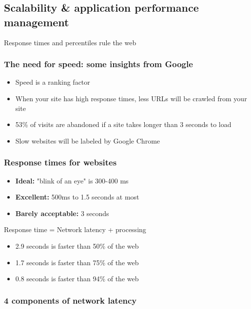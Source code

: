 \documentclass{article}
\begin{document}
\subsection{Scalability \& application performance management}

Response times and percentiles rule the web

\subsubsection{The need for speed: some insights from Google}

\begin{itemize}
    \item Speed is a ranking factor
    \item When your site has high response times, less URLs will be crawled from your site
    \item 53\% of visits are abandoned if a site takes longer than 3 seconds to load
    \item Slow websites will be labeled by Google Chrome
\end{itemize}

\subsubsection{Response times for websites}

\begin{itemize}
    \item \textbf{Ideal:} "blink of an eye" is 300-400 ms
    \item \textbf{Excellent:} 500ms to 1.5 seconds at most
    \item \textbf{Barely acceptable:} 3 seconds
\end{itemize}

Response time = Network latency + processing

\begin{itemize}
    \item 2.9 seconds is faster than 50\% of the web
    \item 1.7 seconds is faster than 75\% of the web
    \item 0.8 seconds is faster than 94\% of the web
\end{itemize}

\subsubsection{4 components of network latency}
\end{document}
